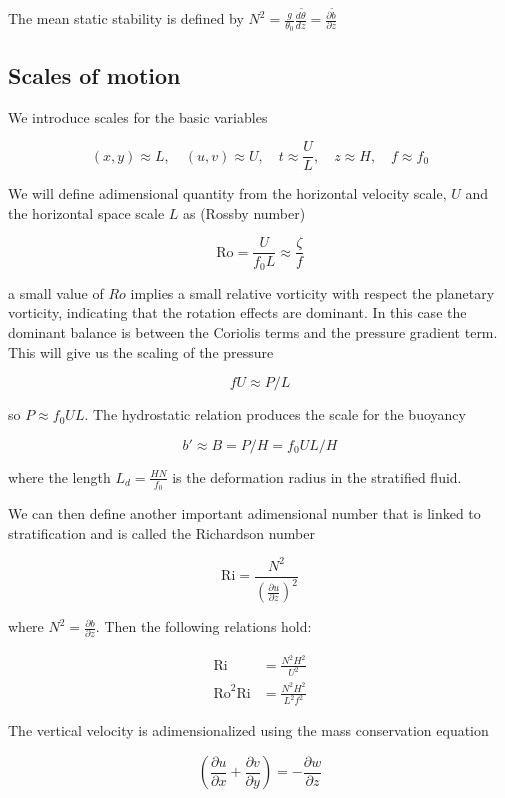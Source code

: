 The mean static stability is defined by
\(N^2 = \frac{g}{\theta_0}\frac{d \tilde{\theta}}{dz}=\frac{\partial \tilde{b}}{\partial z}\)

\subsection{Scales of motion}\label{scales-of-motion}

We introduce scales for the basic variables

{\[(x,y) \approx L, \quad (u,v) \approx U, \quad t\approx \frac{U}{L},\quad z\approx H, \quad f\approx f_0\]}

We will define adimensional quantity from the horizontal velocity scale,
\(U\) and the horizontal space scale \(L\) as (Rossby number)

\[\text{Ro} = \frac{U}{f_0 L} \approx \frac{\zeta}{f}\]

a small value of \(Ro\) implies a small relative vorticity with respect
the planetary vorticity, indicating that the rotation effects are
dominant. In this case the dominant balance is between the Coriolis
terms and the pressure gradient term. This will give us the scaling of
the pressure

\[f U \approx P/L\]

so \(P \approx f_0 U L\). The hydrostatic relation produces the scale
for the buoyancy

{\[b'\approx B = P/H=f_0UL/H\]}

where the length \(L_d = \frac{HN}{f_0}\) is the deformation radius in
the stratified fluid.

We can then define another important adimensional number that is linked
to stratification and is called the Richardson number

\[\text{Ri} = \frac{N^2}{(\frac{\partial u}{\partial z})^2}\]

where \(N^2 =\frac{\partial b}{\partial z}\). Then the following
relations hold:

\[\begin{aligned}
\text{Ri} &= \frac{N^2H^2}{U^2} \\
\text{Ro}^2\text{Ri} &=\frac{N^2 H^2}{L^2 f^2}
\end{aligned}\]

The vertical velocity is adimensionalized using the mass conservation
equation

\[\left(\frac{\partial  u}{\partial x}+\frac{\partial  v}{\partial y}\right)=-\frac{\partial w}{\partial z}\]

